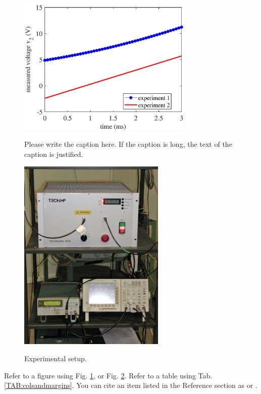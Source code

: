 \documentclass[smallextended,twocolumn]{electrimacs2024}
\newcommand{\figref}[1]{Fig. \ref{#1}}
\newcommand{\tabref}[1]{Tab. \ref{#1}}
\begin{document}
\begin{figure}[!ht]
\centering
  \includegraphics[width=8.4cm]{figures/graph1.eps}\\ %
  \caption{Please write the caption here. If the caption is long, the text of the caption is justified.}\label{FIG:graph1}
\end{figure}%

\begin{figure}[!ht]
\centering
  \includegraphics[width=7.0cm]{figures/photo2.jpg}\\ %
  \caption{Experimental setup.}\label{FIG:photo2}
\end{figure}%

Refer to a figure using \figref{FIG:graph1}, or \figref{FIG:photo2}. Refer to a table using \tabref{TAB:colsandmargins}.
You can cite an item listed in the Reference section as \cite{Teulings1997} or \cite{Maniktala2006,Cousseau2017}.
\end{document}
